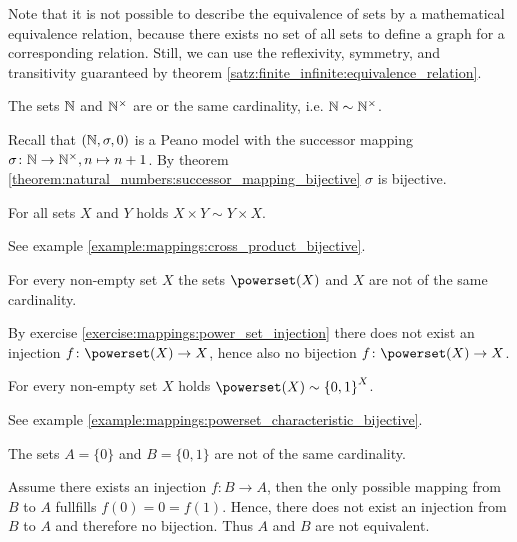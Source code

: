 Note that it is not possible to describe the equivalence of sets by a mathematical equivalence relation, because there exists no set of all sets to define a graph for a corresponding relation. Still, we can use the reflexivity, symmetry, and transitivity guaranteed by theorem \ref{satz:finite_infinite:equivalence_relation}.

\begin{examples}
    \begin{exampleenumerate}
        \item The sets $\mathbb{N}$ and $\mathbb{N}^\times$ are or the same cardinality, i.e. $\mathbb{N}\sim\mathbb{N}^\times$.
        \begin{miniproof}
            Recall that $(\mathbb{N},\sigma,0)$ is a Peano model with the successor mapping $\sigma\colon\mathbb{N}\rightarrow\mathbb{N}^\times, n\mapsto n+1$. By theorem \ref{theorem:natural_numbers:successor_mapping_bijective} $\sigma$ is bijective.
        \end{miniproof}
        \item For all sets $X$ and $Y$ holds $X\times Y\sim Y\times X$.
        \begin{miniproof}
            See example \ref{example:mappings:cross_product_bijective}.
        \end{miniproof}
        \item For every non-empty set $X$ the sets $\powerset(X)$ and $X$ are not of the same cardinality.
        \begin{miniproof}
            By exercise \ref{exercise:mappings:power_set_injection} there does not exist an injection $f\colon \powerset(X)\rightarrow X$, hence also no bijection $f\colon \powerset(X)\rightarrow X$.
        \end{miniproof}
        \item For every non-empty set $X$ holds $\powerset(X)\sim\mapset X {\{0,1\}}$.
        \begin{miniproof}
            See example \ref{example:mappings:powerset_characteristic_bijective}.
        \end{miniproof}
        \item The sets $A=\{0\}$ and $B=\{0,1\}$ are not of the same cardinality.
        \begin{miniproof}
            Assume there exists an injection $f\colon B\rightarrow A$, then the only possible mapping from $B$ to $A$ fullfills $f(0)=0=f(1)$. Hence, there does not exist an injection from $B$ to $A$ and therefore no bijection. Thus $A$ and $B$ are not equivalent.
        \end{miniproof}
    \end{exampleenumerate}
\end{examples}


